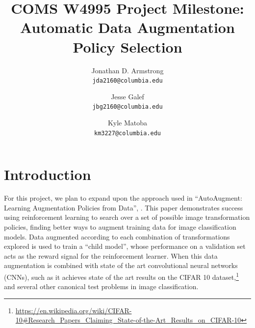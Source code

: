 \documentclass[10pt,twocolumn,letterpaper]{article}
\begin{document}
\title{COMS W4995 Project Milestone: Automatic Data Augmentation Policy Selection}

\author{Jonathan D. Armstrong\\
{\tt\small jda2160@columbia.edu}
\and
Jesse Galef\\
{\tt\small jbg2160@columbia.edu}
\and
Kyle Matoba\\
{\tt\small km3227@columbia.edu}
}

\maketitle


 
\section{Introduction}

	For this project, we plan to expand upon the approach used in ``AutoAugment: Learning Augmentation Policies from Data'', \cite{Cubuk2018}. This paper demonstrates success using reinforcement learning to search over a set of possible image transformation policies, finding better ways to augment training data for image classification models. Data augmented according to each combination of transformations explored is used to train a ``child model'', whose performance on a validation set acts as the reward signal for the reinforcement learner. When this data augmentation is combined with state of the art convolutional neural networks (CNNs), such as \cite{Yamada2018} it achieves state of the art results on the CIFAR 10 dataset,\footnote{\url{https://en.wikipedia.org/wiki/CIFAR-10\#Research\_Papers\_Claiming\_State-of-the-Art\_Results\_on\_CIFAR-10}} and several other canonical test problems in image classification. 
	
\end{document}
